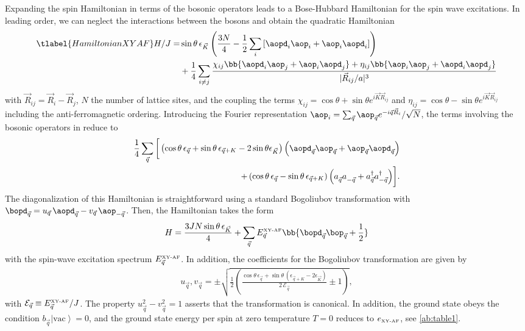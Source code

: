 Expanding the spin Hamiltonian in terms of the bosonic operators leads to a Bose-Hubbard Hamiltonian for the spin wave excitations.
In leading order, we can neglect the interactions between the bosons and obtain the quadratic Hamiltonian
%
\begin{align} \tlabel{HamiltonianXYAF}
H/J = &\sin \theta \, \epsilon_{\vec K} \left(\frac{3 N}{4} - \frac{1}{2}\sum_i\left[\aopd_{i}\aop_i+ \aop_i \aopd_{i}\right]\right) \\
           &+  \frac{1}{4} \sum_{i\ne j} \frac{
    \chi_{i j} \bb{ \aopd_{i} \aop_{j}  + \aop_{i} \aopd_{j} }
  + \eta_{i j} \bb{ \aop_{i} \aop_{j}  + \aopd_{i} \aopd_{j} }
}{|{\vec R}_{ij}/a|^3}
\end{align}
with  ${\vec R}_{ij}={\vec R}_i - {\vec R}_j$,  $N$ the number of lattice sites, and the coupling the terms
$\chi_{i j}=\cos\theta+\sin\theta e^{i {\vec K} {\vec R}_{ij}}$ and $\eta_{i j}=\cos\theta-\sin\theta e^{i {\vec K} {\vec R}_{ij}}$ including the
 anti-ferromagnetic ordering.
Introducing the  Fourier representation $\aop_i =  \sum_{\vec q} \aop_{\vec q}e^{-i {\vec q} {\vec R}_i}/\sqrt{N}$,
the terms involving the bosonic operators in  reduce to
%
\begin{align}
\frac{1}{4} \sum_{\vec q} \bigg[
\left( \cos\theta \, \epsilon_{\vec q} +\sin\theta \, \epsilon_{\vec q+K} - 2 \sin \theta \epsilon_{\vec K}\right)\Big(\aopd_{\vec q} \aop_{\vec q}  + \aop_{\vec q} \aopd_{\vec q}\Big) \\
+\left( \cos\theta \, \epsilon_{\vec q}-\sin\theta \, \epsilon_{\vec q+K} \right)\Big(a^{\phantom\dag}_{\vec q} a^{\phantom\dag}_{-\vec q}
+ a^{\dag}_{\vec q} a^{\dag}_{-{\vec q}} \Big) \bigg].
\end{align}
%
The diagonalization of this Hamiltonian is straightforward using a standard Bogoliubov transformation
with $\bopd_{\vec q} = u_{\vec q}\, \aopd_{\vec q} - v_{\vec q}\, \aop_{-\vec q}$.
Then, the Hamiltonian takes the form
%
\begin{align}
H = \frac{3J N \sin \theta\, \epsilon_{\vec K}}{4}  + \sum_{\vec q} E^{\mbox{\tiny XY-AF}}_{\vec q} \bb{\bopd_{\vec q}\bop_{\vec q} + \frac{1}{2}}
\end{align}
%
with the spin-wave excitation spectrum $E^{\mbox{\tiny XY-AF}}_{\vec q}$. In addition, the coefficients  for the Bogoliubov transformation
are given by
%
\begin{align}
u_{\vec q} , v_{\vec q} = \pm\sqrt{\frac{1}{2} \left( \frac{\cos\theta \, \epsilon_{\vec q} +\sin\theta \, (\epsilon_{\vec q+K} - 2 \epsilon_{\vec K})}{2\, \mathcal{E}_{\vec q}}\pm 1\right)},
\end{align}
%
with $\mathcal{E}_{\vec q} \equiv E^{\mbox{\tiny XY-AF}}_{\vec q} / J $.
The property $u^2_{\vec q}-v^2_{\vec q}=1$ asserts that the transformation is canonical.
In addition, the ground state obeys the condition $b_{\vec q} \left|\text{vac}\right\rangle = 0$, and the ground state energy per spin at zero temperature $T=0$
reduces to $e_{\mbox{\tiny XY-AF}}$, see \cref{ab:table1}.

